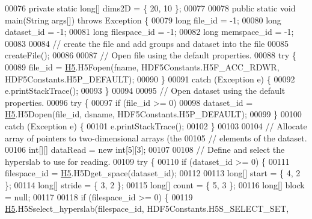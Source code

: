\begin{DoxyCode}
00076     \textcolor{keyword}{private} \textcolor{keyword}{static} \textcolor{keywordtype}{long}[] dims2D = \{ 20, 10 \};
00077 
00078     \textcolor{keyword}{public} \textcolor{keyword}{static} \textcolor{keywordtype}{void} main(String args[]) \textcolor{keywordflow}{throws} Exception \{
00079         \textcolor{keywordtype}{long} file\_id = -1;
00080         \textcolor{keywordtype}{long} dataset\_id = -1;
00081         \textcolor{keywordtype}{long} filespace\_id = -1;
00082         \textcolor{keywordtype}{long} memspace\_id = -1;
00083 
00084         \textcolor{comment}{// create the file and add groups and dataset into the file}
00085         createFile();
00086 
00087         \textcolor{comment}{// Open file using the default properties.}
00088         \textcolor{keywordflow}{try} \{
00089             file\_id = \hyperlink{namespace_h5}{H5}.H5Fopen(fname, HDF5Constants.H5F\_ACC\_RDWR, HDF5Constants.H5P\_DEFAULT);
00090         \}
00091         \textcolor{keywordflow}{catch} (Exception e) \{
00092             e.printStackTrace();
00093         \}
00094 
00095         \textcolor{comment}{// Open dataset using the default properties.}
00096         \textcolor{keywordflow}{try} \{
00097             \textcolor{keywordflow}{if} (file\_id >= 0)
00098                 dataset\_id = \hyperlink{namespace_h5}{H5}.H5Dopen(file\_id, dsname, HDF5Constants.H5P\_DEFAULT);
00099         \}
00100         \textcolor{keywordflow}{catch} (Exception e) \{
00101             e.printStackTrace();
00102         \}
00103 
00104         \textcolor{comment}{// Allocate array of pointers to two-dimensional arrays (the}
00105         \textcolor{comment}{// elements of the dataset.}
00106         \textcolor{keywordtype}{int}[][] dataRead = \textcolor{keyword}{new} \textcolor{keywordtype}{int}[5][3];
00107 
00108         \textcolor{comment}{// Define and select the hyperslab to use for reading.}
00109         \textcolor{keywordflow}{try} \{
00110             \textcolor{keywordflow}{if} (dataset\_id >= 0) \{
00111                 filespace\_id = \hyperlink{namespace_h5}{H5}.H5Dget\_space(dataset\_id);
00112 
00113                 \textcolor{keywordtype}{long}[] start = \{ 4, 2 \};
00114                 \textcolor{keywordtype}{long}[] stride = \{ 3, 2 \};
00115                 \textcolor{keywordtype}{long}[] count = \{ 5, 3 \};
00116                 \textcolor{keywordtype}{long}[] block = null;
00117 
00118                 \textcolor{keywordflow}{if} (filespace\_id >= 0) \{
00119                     \hyperlink{namespace_h5}{H5}.H5Sselect\_hyperslab(filespace\_id, HDF5Constants.H5S\_SELECT\_SET,

\end{DoxyCode}
